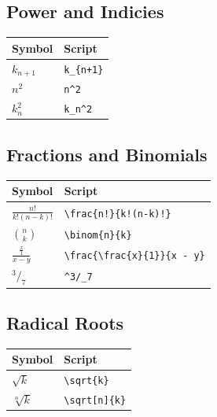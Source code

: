 \documentclass[
]{book}
\begin{document}
\hypertarget{power-and-indicies}{%
\subsection{Power and Indicies}\label{power-and-indicies}}

\begin{longtable}[]{@{}ll@{}}
\toprule\noalign{}
Symbol & Script \\
\midrule\noalign{}
\endhead
\bottomrule\noalign{}
\endlastfoot
\(k_{n+1}\) & \texttt{k\_\{n+1\}} \\
\(n^2\) & \texttt{n\^{}2} \\
\(k_n^2\) & \texttt{k\_n\^{}2} \\
\end{longtable}

\hypertarget{fractions-and-binomials}{%
\subsection{Fractions and Binomials}\label{fractions-and-binomials}}

\begin{longtable}[]{@{}ll@{}}
\toprule\noalign{}
Symbol & Script \\
\midrule\noalign{}
\endhead
\bottomrule\noalign{}
\endlastfoot
\(\frac{n!}{k!(n-k)!}\) & \texttt{\textbackslash{}frac\{n!\}\{k!(n-k)!\}} \\
\(\binom{n}{k}\) & \texttt{\textbackslash{}binom\{n\}\{k\}} \\
\(\frac{\frac{x}{1}}{x - y}\) & \texttt{\textbackslash{}frac\{\textbackslash{}frac\{x\}\{1\}\}\{x\ -\ y\}} \\
\(^3/_7\) & \texttt{\^{}3/\_7} \\
\end{longtable}

\hypertarget{radical-roots}{%
\subsection{Radical Roots}\label{radical-roots}}

\begin{longtable}[]{@{}ll@{}}
\toprule\noalign{}
Symbol & Script \\
\midrule\noalign{}
\endhead
\bottomrule\noalign{}
\endlastfoot
\(\sqrt{k}\) & \texttt{\textbackslash{}sqrt\{k\}} \\
\(\sqrt[n]{k}\) & \texttt{\textbackslash{}sqrt{[}n{]}\{k\}} \\
\end{longtable}
\end{document}
